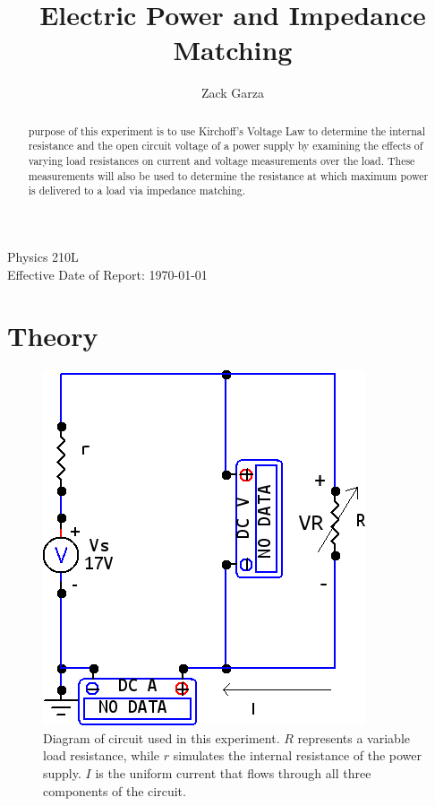 \documentclass[twocolumn,english]{IEEEtran}
\theoremstyle{plain}
\theoremstyle{plain}
\begin{document}
\title{Electric Power and Impedance Matching}


\author{Zack Garza}


\IEEEspecialpapernotice
{Physics 210L \\
Effective Date of Report: \today}


\maketitle
\begin{abstract}
 purpose of this experiment is to use Kirchoff's Voltage Law to determine the internal resistance and the open circuit voltage of a power supply by examining the effects of varying load resistances on current and voltage measurements over the load. These measurements will also be used to determine the resistance at which maximum power is delivered to a load via impedance matching.
\end{abstract}
\tableofcontents

\section{Theory}
\begin{figure}[h!]
  \begin{centering}
  \begin{center}
  \includegraphics[width=\linewidth]{./circuit.png}
  \caption{Diagram of circuit used in this experiment. $R$ represents a variable load resistance, while $r$ simulates the internal resistance of the power supply. $I$ is the uniform current that flows through all three components of the circuit.}
  \label{fig:circuit_diagram}
  \end{center}
  \par\end{centering}
  \end{figure}
\end{document}
